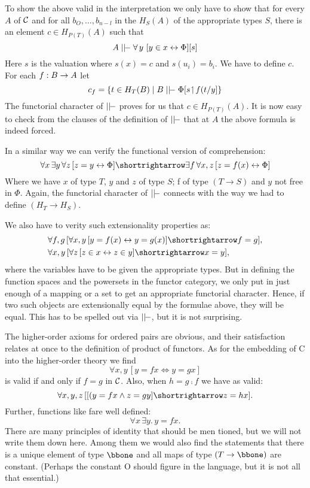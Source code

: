 To show the above valid in the interpretation we only have
to show that for every $A$ of $\mathcal C$ and for all $b_O, \dots ,b_{n-l}$ in the $H_S(A)$ of the appropriate types $S$, there is an element
$c \in H_{P(T)}(A)$ such that 
$$
A \mm \forall\, y \,\, [y \in x \iff \Phi][s]
$$
%
Here $s$ is the valuation where $s(x) = c$ and $s(u_i) = b_i$. We have to define $c$. For each $f: B \rightarrow A$ let
$$
c_f = \{t \in H_T(B) \mid B \mm \Phi [s \res f(t/y] \}
$$
%
The functorial character of $\mm$ proves for us that $c \in H_{P(T)}(A)$. It is now easy to check from the clauses of the definition of $\mm$ that at $A$ the above formula is indeed forced.

In a similar way we can verify the functional version of comprehension:
$$
\forall x \, \exists y \, \forall z \, [ z = y \iff \Phi] \imp \exists f\, \forall x,z\, [z = f(x) \iff \Phi ]
$$
%
Where we have $x$ of type $T$, $y$ and $z$ of type $S$; f of type $(T\to S)$ and $y$ not free in $\Phi$. Again, the functorial character of $\mm$ 
con­nects with the way we had to define $(H_T \to H_S)$.

We also have to verity such extensionality properties as:
\begin{align*}
&\forall f,g \, [\forall x,y \, [ y = f(x) \iff y = g(x) ] \imp f = g],\\
&\forall x,y \, [\forall z \, [ z \in x \iff z \in y ] \imp x = y],
\end{align*}
%
where the variables have to be given the appropriate types. But in defining the function spaces and the powersets in the functor category, we only put in just enough of a mapping or a set to get an appropriate functorial character. Hence, if two such objects are extensionally equal by the formulae above, they will be equal. This has to be spelled out via $\mm$, but it is not surprising.

The higher-order axioms for ordered pairs are obvious, and their satisfaction relates at once to the definition of product of functors. As for the embedding of C into the higher-order theory we find
$$
\forall x,y \, [y = f x \iff y = gx]
$$
is valid if and only if $f = g$ in $\mathcal C$. Also, when $h = g \comp f$ we have as valid:
$$
\forall x,y,z\, [[(y = fx \land z = gy]	\imp z = hx].
$$
Further, functions like fare well defined:
$$
\forall x\, \exists y.\,	y = fx .
$$
There are many principles of identity that should be men­ tioned, but we will not write them down here. Among them we would also find the statements that there is a unique element of type $\bbone$ and all maps of type $(T\to \bbone )$ are constant. (Perhaps the constant O should figure in the language, but it is not all
that essential.)

